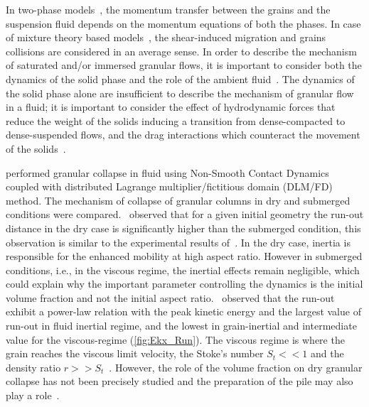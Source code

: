 In two-phase models~\citep{Pitman2005}, the momentum transfer between the 
grains and the suspension fluid depends on the momentum equations of both 
the phases. In case of mixture theory based models~\citep{Meruane2010}, the 
shear-induced migration and grains collisions are considered in an average 
sense. In order to describe the mechanism of saturated and/or immersed granular 
flows, it is important to consider both the dynamics of the solid phase and the 
role of the ambient fluid~\citep{Denlinger2001,Iverson1997}. The dynamics of 
the solid phase alone are insufficient to describe the mechanism of granular 
flow in a fluid; it is important to consider the effect of hydrodynamic forces 
that reduce the weight of the solids inducing a transition from dense-compacted 
to dense-suspended flows, and the drag interactions which counteract the 
movement of the solids~\citep{Meruane2010}.

\citet{Topin2011} performed granular collapse in fluid using Non-Smooth Contact 
Dynamics coupled with distributed Lagrange multiplier/fictitious domain 
(DLM/FD) method. The mechanism of collapse of granular columns in dry and 
submerged conditions were compared.~\citet{Topin2011} observed that for a given 
initial geometry the run-out distance in the dry case is significantly higher 
than the submerged condition, this observation is similar to the experimental 
results of~\citet{Cassar2005}. In the dry 
case, inertia is responsible for the enhanced mobility at high 
aspect ratio. However in submerged conditions, i.e., in the viscous regime, the 
inertial effects remain negligible, which could explain why the important 
parameter controlling the dynamics is the initial volume fraction and not the 
initial aspect ratio.~\citet{Topin2011} observed that the run-out exhibit a 
power-law relation with the peak kinetic energy and the largest value of 
run-out in fluid inertial regime, and the lowest in grain-inertial and 
intermediate value for the viscous-regime (\cref{fig:Ekx_Run}). The viscous 
regime is where the grain reaches the viscous limit velocity, the Stoke's 
number $S_t << 1$ and the density ratio $r >> S_t$~\citep{CourrechDuPont2003}. 
However, the role of the volume fraction on dry granular collapse has not been 
precisely studied and the preparation of the 
pile may also play a role~\citet{Daerr1999a}.

